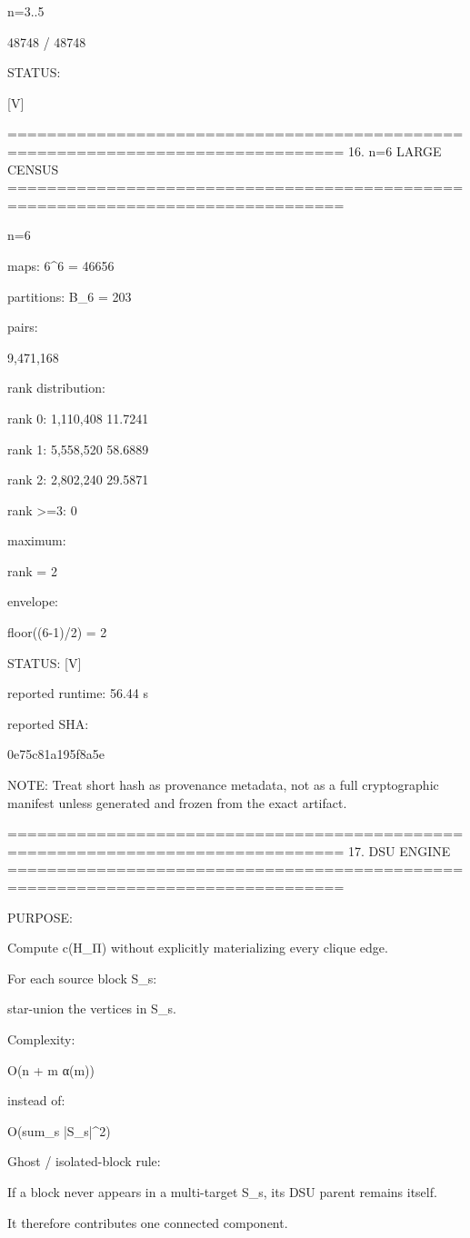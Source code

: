 n=3..5

48748 / 48748

STATUS:

[V]

================================================================================
16. n=6 LARGE CENSUS
================================================================================

n=6

maps:
6^6 = 46656

partitions:
B_6 = 203

pairs:

9,471,168

rank distribution:

rank 0:
1,110,408
11.7241%

rank 1:
5,558,520
58.6889%

rank 2:
2,802,240
29.5871%

rank >=3:
0

maximum:

rank = 2

envelope:

floor((6-1)/2) = 2

STATUS:
[V]

reported runtime:
56.44 s

reported SHA:

0e75c81a195f8a5e

NOTE:
Treat short hash as provenance metadata, not as a full cryptographic
manifest unless generated and frozen from the exact artifact.

================================================================================
17. DSU ENGINE
================================================================================

PURPOSE:

Compute c(H_Π) without explicitly materializing every clique edge.

For each source block S_s:

star-union the vertices in S_s.

Complexity:

O(n + m α(m))

instead of:

O(sum_s |S_s|^2)

Ghost / isolated-block rule:

If a block never appears in a multi-target S_s,
its DSU parent remains itself.

It therefore contributes one connected component.

